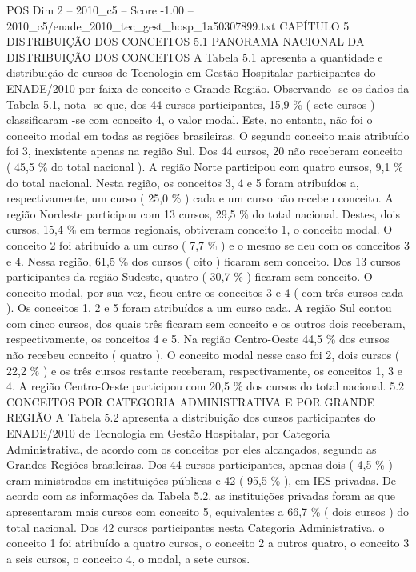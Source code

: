 \begin{textsample}{POS Dim 2 – 2010\_c5 – Score -1.00 – 2010\_c5/enade\_2010\_tec\_gest\_hosp\_1a50307899.txt}  \label{ex:f2_pos_329}
CAPÍTULO 5 DISTRIBUIÇÃO DOS CONCEITOS 5.1 PANORAMA NACIONAL DA DISTRIBUIÇÃO DOS CONCEITOS A Tabela 5.1 apresenta a quantidade e distribuição de cursos de Tecnologia em Gestão Hospitalar participantes do ENADE/2010 por faixa de conceito e Grande Região.
Observando -se os dados da Tabela 5.1, nota -se que, dos 44 cursos participantes, 15,9 \% ( sete cursos ) classificaram -se com conceito 4, o valor modal.
Este, no entanto, não foi o conceito modal em todas as regiões brasileiras.
O segundo conceito mais atribuído foi 3, inexistente apenas na região Sul.
Dos 44 cursos, 20 não receberam conceito ( 45,5 \% do total nacional ).
A região Norte participou com quatro cursos, 9,1 \% do total nacional.
Nesta região, os conceitos 3, 4 e 5 foram atribuídos a, respectivamente, um curso ( 25,0 \% ) cada e um curso não recebeu conceito.
A região Nordeste participou com 13 cursos, 29,5 \% do total nacional.
Destes, dois cursos, 15,4 \% em termos regionais, obtiveram conceito 1, o conceito modal.
O conceito 2 foi atribuído a um curso ( 7,7 \% ) e o mesmo se deu com os conceitos 3 e 4.
Nessa região, 61,5 \% dos cursos ( oito ) ficaram sem conceito.
Dos 13 cursos participantes da região Sudeste, quatro ( 30,7 \% ) ficaram sem conceito.
O conceito modal, por sua vez, ficou entre os conceitos 3 e 4 ( com três cursos cada ).
Os conceitos 1, 2 e 5 foram atribuídos a um curso cada.
A região Sul contou com cinco cursos, dos quais três ficaram sem conceito e os outros dois receberam, respectivamente, os conceitos 4 e 5.
Na região Centro-Oeste 44,5 \% dos cursos não recebeu conceito ( quatro ).
O conceito modal nesse caso foi 2, dois cursos ( 22,2 \% ) e os três cursos restante receberam, respectivamente, os conceitos 1, 3 e 4.
A região Centro-Oeste participou com 20,5 \% dos cursos do total nacional. 5.2 CONCEITOS POR CATEGORIA ADMINISTRATIVA E POR GRANDE REGIÃO A Tabela 5.2 apresenta a distribuição dos cursos participantes do ENADE/2010 de Tecnologia em Gestão Hospitalar, por Categoria Administrativa, de acordo com os conceitos por eles alcançados, segundo as Grandes Regiões brasileiras.
Dos 44 cursos participantes, apenas dois ( 4,5 \% ) eram ministrados em instituições públicas e 42 ( 95,5 \% ), em IES privadas.
De acordo com as informações da Tabela 5.2, as instituições privadas foram as que apresentaram mais cursos com conceito 5, equivalentes a 66,7 \% ( dois cursos ) do total nacional.
Dos 42 cursos participantes nesta Categoria Administrativa, o conceito 1 foi atribuído a quatro cursos, o conceito 2 a outros quatro, o conceito 3 a seis cursos, o conceito 4, o modal, a sete cursos.

\end{textsample}
